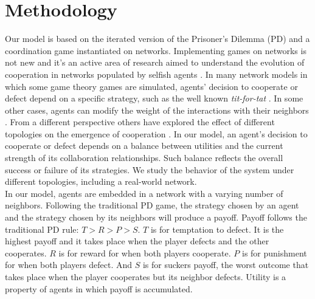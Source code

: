 \documentclass{bmcart}
\begin{document}
\section*{Methodology}


Our model is based on the iterated version of the Prisoner's Dilemma (PD) and a
coordination game instantiated on
networks. Implementing games on networks is not new and it's an active area of
research aimed to understand the evolution of cooperation in networks populated
by selfish agents \cite{SzaboFath:2007,Nowak-etal:92,OshtukiNowak:2006,Santos-etal:2005,Santos-etal:2006}. In many network models
in which some game theory games are simulated, agents' decision to cooperate
or defect depend on a specific strategy, such as the well known
\textit{tit-for-tat} \cite{Axelrod:2006,Nowak-etal:2011}. In some other cases, agents
can modify the weight of the interactions with their neighbors
\cite{Santos-etal:2006}. From a different perspective others have explored the effect
of different topologies on the emergence of cooperation
\cite{Santos-etal:2005,HauertDoebeli:2004}. In our model, an agent's decision to
cooperate or defect depends on a balance between
utilities and the current strength of its collaboration relationships. Such
balance reflects the overall success or failure of its strategies. We
study the behavior of the system under different topologies, including a
real-world network.\\  


In our model, agents are embedded in a network with a varying number of
neighbors. Following the traditional PD game, the strategy chosen by an agent
and the strategy chosen by its neighbors will produce a payoff. Payoff follows
the traditional PD rule: $T > R > P > S$. $T$ is for temptation to defect. It is the highest
payoff and it takes place when the player defects and the other cooperates. $R$
is for reward for when both players cooperate. $P$ is for punishment for when
both players defect. And $S$ is for suckers payoff, the worst outcome that
takes place when the player cooperates but its neighbor defects. Utility is a
property of agents in which payoff is accumulated.\\   
\end{document}
